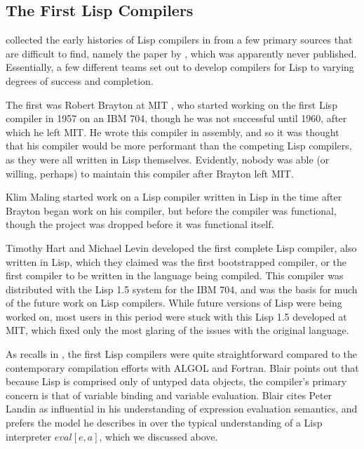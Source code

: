 \subsection{The First Lisp Compilers}

\citeauthor{allen_anatomy_of_lisp_1978} collected the early histories of Lisp compilers
in \cite{allen_anatomy_of_lisp_1978}
from a few primary sources that are difficult to find, namely
the paper  by \citeauthor{blair_structure_lisp_compiler_1971},
which was apparently never published.
Essentially, a few different teams set out to develop compilers for Lisp
to varying degrees of success and completion.

The first was Robert Brayton at MIT \cite{blair_structure_lisp_compiler_1971},
who started working on the first Lisp compiler in 1957 on an IBM 704,
though he was not successful until 1960, after which he left MIT.
He wrote this compiler in assembly, and so it was thought that his compiler
would be more performant than the competing Lisp compilers, as they were
all written in Lisp themselves.
Evidently, nobody was able (or willing, perhaps) to maintain this compiler
after Brayton left MIT.

Klim Maling started work on a Lisp compiler written in Lisp
in the time after Brayton began work on his compiler, but before the compiler
was functional, though the project was dropped before it was functional itself.

Timothy Hart and Michael Levin developed the first complete Lisp compiler,
also written in Lisp, which
they claimed was the first \gls{bootstrap}ped compiler,
or the first compiler to be written in the language being compiled.
This compiler was distributed with the Lisp 1.5 system for the IBM 704,
and was the basis for much of the future work on Lisp compilers.
While future versions of Lisp were being worked on, most users in this period
were stuck with this Lisp 1.5 developed at MIT, which fixed only
the most glaring of the issues with the original language.

As \citeauthor{blair_structure_lisp_compiler_1971} recalls in ,
the first Lisp compilers were quite straightforward compared to the contemporary compilation efforts
with ALGOL and Fortran.
Blair points out that because Lisp is comprised only of untyped data objects,
the compiler's primary concern is that of variable binding and variable evaluation.
Blair cites Peter Landin as influential in his understanding of expression
evaluation semantics, and prefers the model he describes in 
over the typical understanding of a Lisp interpreter $eval[e, a]$, which we discussed above.


